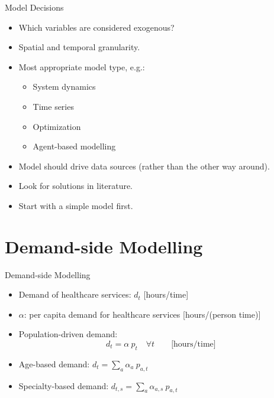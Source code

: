 \documentclass[aspectratio=169, 10pt]{beamer}
\begin{document}
\begin{frame}{Model Decisions}
    \begin{itemize}
        \item Which variables are considered exogenous?
        \item Spatial and temporal granularity.
        \item Most appropriate model type, e.g.:
        \begin{itemize}
            \item System dynamics
            \item Time series
            \item Optimization
            \item Agent-based modelling
        \end{itemize}
        \item Model should drive data sources (rather than the other way around).
        \item Look for solutions in literature.
        \item Start with a simple model first.
    \end{itemize}
\end{frame}


\section{Demand-side Modelling}
\begin{frame}{Demand-side Modelling}
    \begin{itemize}
        \item Demand of healthcare services: $d_{t}$ [hours/time]
        \item $\alpha$: per capita demand for healthcare services [hours/(person time)]
        \item Population-driven demand:
        \begin{equation*}
            d_{t} = \alpha\ p_{t} \quad \forall t\quad\quad \text{[hours/time]}
        \end{equation*}
        \item Age-based demand: $d_{t} = \sum_{a} \alpha_{a}\ p_{a,t}$
        \item Specialty-based demand: $d_{t,s} = \sum_{a} \alpha_{a,s}\ p_{a,t}$
    \end{itemize}
\end{frame}
\end{document}
